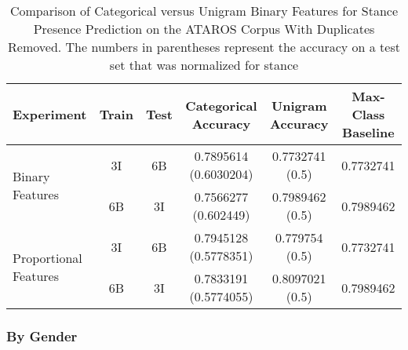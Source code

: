 \begin{table}[h]
\centering
\begin{tabular}{l c c c c c}
	\textbf{Experiment} & \textbf{Train} & \textbf{Test} & \textbf{Categorical Accuracy} & \textbf{Unigram Accuracy} & \textbf{Max-Class Baseline} \\
	\hline
	\multirow{2}{*}{Binary Features} 
	    & 3I  & 6B & \num{0.7895614} (\num{0.6030204}) & \num{0.7732741} (\num{0.5}) & \num{0.7732741} \\   
	    & 6B  & 3I & \num{0.7566277} (\num{0.602449}) & \num{0.7989462} (\num{0.5}) & \num{0.7989462} \\
	\hline
	\multirow{2}{*}{Proportional Features} 
	    & 3I  & 6B & \num{0.7945128} (\num{0.5778351}) & \num{0.779754} (\num{0.5}) & \num{0.7732741} \\   
	    & 6B  & 3I & \num{0.7833191} (\num{0.5774055}) & \num{0.8097021} (\num{0.5}) & \num{0.7989462} \\
\end{tabular}
\caption{Comparison of Categorical versus Unigram Binary Features for Stance Presence Prediction on the ATAROS Corpus With Duplicates Removed.  The numbers in parentheses represent the accuracy on a test set that was normalized for stance}
\label{tab:cat_vs_unigram_feats_binary_nodupes}
\end{table}

\subsubsection*{By Gender} 

